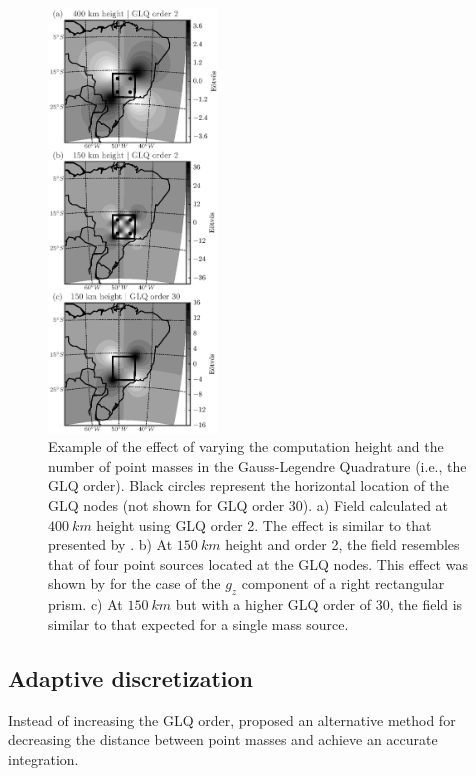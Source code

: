 \documentclass[paper,twocolumn]{geophysics}
\begin{document}
\begin{figure}
    \centering
    \includegraphics[width=0.4\textwidth]{figs/vary-height-and-order}
    \caption{
        Example of the effect of varying
        the computation height
        and the number of point masses in the Gauss-Legendre Quadrature
        (i.e., the GLQ order).
        Black circles represent the horizontal location of the GLQ nodes
        (not shown for GLQ order 30).
        a) Field calculated at $400\ km$ height using GLQ order 2.
        The effect is similar to that presented by \citet{Asgharzadeh2007}.
        b) At $150\ km$ height and order 2,
        the field resembles that of
        four point sources located at the GLQ nodes.
        This effect was shown by \citet{Ku1977}
        for the case of the $g_z$ component of a right rectangular prism.
        c) At $150\ km$ but with a higher GLQ order of 30,
        the field is similar to that expected for a single mass source.
    }
    \label{fig:glqerrorsample}
\end{figure}


\subsection{Adaptive discretization}


Instead of increasing the GLQ order,
\citet{Li2011} proposed an alternative method
for decreasing the distance between point masses
and achieve an accurate integration.
\end{document}
